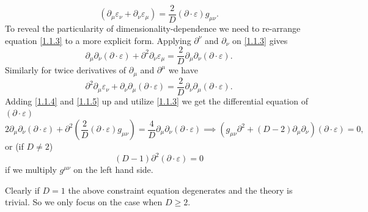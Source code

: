 \documentclass[10pt,nofootinbib]{revtex4}
\begin{document}
	\begin{equation}\label{1.1.3}
		\boxed{(\partial_\mu \varepsilon_\nu+\partial_\nu \varepsilon_\mu)=\dfrac{2}{D}(\partial \cdot \varepsilon)g_{\mu\nu}.}
	\end{equation}
	\indent To reveal the particularity of dimensionality-dependence we need to re-arrange equation \eqref{1.1.3} to a more explicit form. Applying $\partial^\nu$ and $\partial_\nu$ on \eqref{1.1.3} gives
	\begin{equation}\label{1.1.4}
		\partial_\mu\partial_\nu(\partial \cdot \varepsilon)+\partial^2\partial_\nu\varepsilon_\mu=\dfrac{2}{D}\partial_\mu \partial_\nu(\partial\cdot\varepsilon).
	\end{equation}
	Similarly for twice derivatives of $\partial_\mu$ and $\partial^\mu$ we have
	\begin{equation}\label{1.1.5}
		\partial^2\partial_\mu\varepsilon_\nu+\partial_\nu\partial_\mu(\partial \cdot \varepsilon)=\dfrac{2}{D}\partial_\nu \partial_\mu(\partial\cdot\varepsilon).
	\end{equation}
	Adding \eqref{1.1.4} and \eqref{1.1.5} up and utilize \eqref{1.1.3} we get the differential equation of $(\partial\cdot\varepsilon)$
	\begin{equation}\label{1.1.6}
		2\partial_\mu \partial_\nu(\partial\cdot\varepsilon)+\partial^2\left(\dfrac{2}{D}(\partial\cdot \varepsilon)g_{\mu\nu}\right)=\dfrac{4}{D}\partial_\mu \partial_\nu(\partial\cdot\varepsilon)\implies (g_{\mu\nu}\partial^2+(D-2)\partial_\mu \partial_\nu)(\partial\cdot \varepsilon)=0,
	\end{equation}
	or ({\color{red}if $D\neq2$})
	\begin{equation*}
		(D-1)\partial^2(\partial \cdot \varepsilon)=0
	\end{equation*}
	if we multiply $g^{\mu\nu}$ on the left hand side.\par
	Clearly if $D=1$ the above constraint equation degenerates and the theory is trivial. So we only focus on the case when $D\geq2$.
\end{document}
